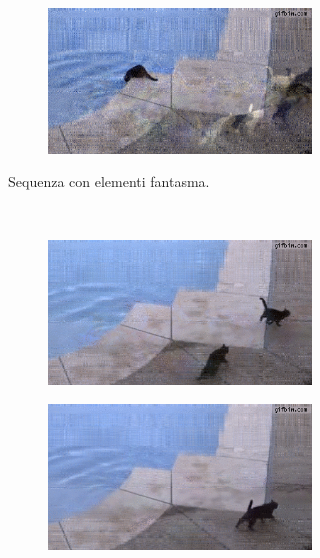 \documentclass[11pt,a4paper]{article}
\begin{document}
\begin{figure}
\begin{subfigure}[]{\wid\textwidth}
    \begin{subfigure}[]{\wid\textwidth}
      \centering
      \includegraphics[keepaspectratio=true, scale=\scal]{Imgs/Cats/frame-12}
    \end{subfigure}
    \caption{Sequenza con elementi fantasma.}\label{fig:cats_sequence_phantoms}
  \end{subfigure}
  ~
  \begin{subfigure}[]{\wid\textwidth}
    \begin{subfigure}[]{\wid\textwidth}
      \centering
      \includegraphics[keepaspectratio=true, scale=\scal]{Imgs/Cats/frame-105}
    \end{subfigure}
    
    \begin{subfigure}[]{\wid\textwidth}
      \centering
      \includegraphics[keepaspectratio=true, scale=\scal]{Imgs/Cats/frame-111}
    \end{subfigure}
    

\end{subfigure}
\end{figure}
\end{document}
